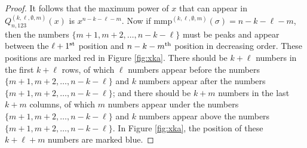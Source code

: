 \documentclass[
final,nomarks
]{dmtcs-episciences}
\newcommand{\fref}[1]{Figure \ref{fig:#1}}
\newcommand{\Qmn}[2]{Q_{#2,123}^{(#1)}(x)}
\newcommand{\mmp}{\mathrm{mmp}}
\newcommand{\thn}[1]{\begin{math}#1^\textnormal{th}\end{math}}
\begin{document}
\begin{proof}
	It follows that the maximum power of \begin{math}x\end{math} that can appear in \begin{math}\Qmn{k,\ell,\emptyset,m}{n}\end{math} is 
	\begin{math}x^{n-k-\ell-m}\end{math}. Now if \begin{math}\mmp^{(k,\ell,\emptyset,m)}(\sigma) = n-k-\ell-m\end{math}, then 
	the numbers \begin{math}\{m+1,m+2,\ldots,n-k-\ell\}\end{math} must be peaks and appear between the \begin{math}\ell+1^{\textnormal{st}}\end{math} position and \thn{n-k-m} position in decreasing order. These positions are marked red in \fref{xka}. There should be \begin{math}k+\ell\end{math} numbers in the first \begin{math}k+\ell\end{math} rows, of which \begin{math}\ell\end{math} numbers appear before the numbers \begin{math}\{m+1,m+2,\ldots,n-k-\ell\}\end{math} and \begin{math}k\end{math} numbers appear after the numbers \begin{math}\{m+1,m+2,\ldots,n-k-\ell\}\end{math}; and there should be \begin{math}k+m\end{math} numbers in the last \begin{math}k+m\end{math} columns, of which \begin{math}m\end{math} numbers appear under the numbers \begin{math}\{m+1,m+2,\ldots,n-k-\ell\}\end{math} and \begin{math}k\end{math} numbers appear above the numbers \begin{math}\{m+1,m+2,\ldots,n-k-\ell\}\end{math}. In \fref{xka}, the position of these \begin{math}k+\ell+m\end{math} numbers are marked blue. 
\end{proof}
\end{document}
